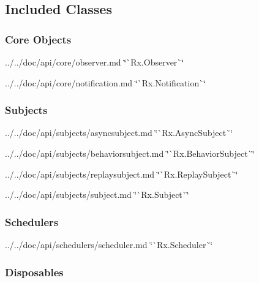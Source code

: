 \subsection*{Included Classes}

\subsubsection*{Core Objects}


\begin{DoxyItemize}
\item ../../doc/api/core/observer.md \char`\"{}\`{}\+Rx.\+Observer\`{}\char`\"{}
\item ../../doc/api/core/notification.md \char`\"{}\`{}\+Rx.\+Notification\`{}\char`\"{}
\end{DoxyItemize}

\subsubsection*{Subjects}


\begin{DoxyItemize}
\item ../../doc/api/subjects/asyncsubject.md \char`\"{}\`{}\+Rx.\+Async\+Subject\`{}\char`\"{}
\item ../../doc/api/subjects/behaviorsubject.md \char`\"{}\`{}\+Rx.\+Behavior\+Subject\`{}\char`\"{}
\item ../../doc/api/subjects/replaysubject.md \char`\"{}\`{}\+Rx.\+Replay\+Subject\`{}\char`\"{}
\item ../../doc/api/subjects/subject.md \char`\"{}\`{}\+Rx.\+Subject\`{}\char`\"{}
\end{DoxyItemize}

\subsubsection*{Schedulers}


\begin{DoxyItemize}
\item ../../doc/api/schedulers/scheduler.md \char`\"{}\`{}\+Rx.\+Scheduler\`{}\char`\"{}
\end{DoxyItemize}

\subsubsection*{Disposables}


